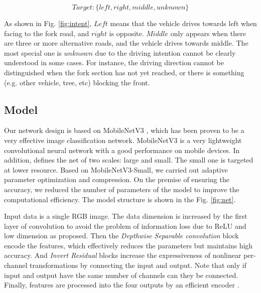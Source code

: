\documentclass[journal]{IEEEtran}
\begin{document}
    $$Target: \{ left, right, middle, unknown\}$$

As shown in Fig. \ref{fig:intent}, $Left$ means that the vehicle drives towards left when facing to the fork road, and $right$ is opposite.
$Middle$ only appears when there are three or more alternative roads, and the vehicle drives towards middle. The most special one is $unknown$ due to the driving intention cannot be clearly understood in some cases. For instance, the driving direction cannot be distinguished when the fork section has not yet reached, or there is something (e.g. other vehicle, tree, etc) blocking the front.



\subsection{Model}
Our network design is based on MobileNetV3 \cite{mobilenetv3}, which has been proven to be a very effective image classification network. MobileNetV3 is a very lightweight convolutional neural network with a good performance on mobile devices. In addition, \cite{mobilenetv3} defines the net of two scales: large and small. The small one is targeted at lower resource. Based on MobileNetV3-Small, we carried out adaptive parameter optimization and compression. On the premise of ensuring the accuracy, we reduced the number of parameters of the model to improve the computational efficiency. The model structure is shown in the Fig. \ref{fig:net}.

Input data is a single RGB image. The data dimension is increased by the first layer of convolution to avoid the problem of information loss due to ReLU and low dimension as \cite{mobilenetv2} proposed. Then the \textit{Depthwise Separable convolution} \cite{howard2017mobilenets} block encode the features, which effectively reduces the parameters but maintains high accuracy. And \textit{Invert Residual} \cite{mobilenetv2} blocks increase the expressiveness of nonlinear per-channel transformations by connecting the input and output. Note that only if input and output have the same number of channels can they be connected. Finally, features are processed into the four outputs by an efficient encoder \cite{mobilenetv3}. 
\end{document}
